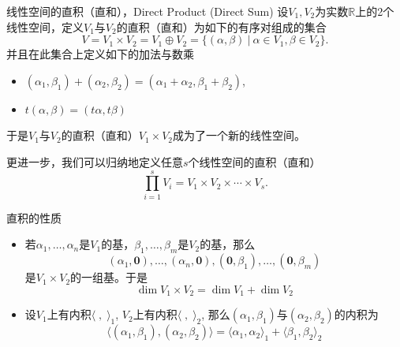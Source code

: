 \begin{frame}

\begin{block}{线性空间的直积（直和），Direct Product (Direct Sum)}
设$V_1,V_2$为实数$\mathbb{R}$上的2个线性空间，定义$V_1$与$V_2$的直积（直和）为如下的有序对组成的集合
\[V = V_1\times V_2 = V_1\oplus V_2 = \{ (\alpha, \beta) \ |\ \alpha \in V_1, \beta \in V_2\}.\]
并且在此集合上定义如下的加法与数乘
\begin{itemize}
\item $(\alpha_1, \beta_1) + (\alpha_2, \beta_2) = (\alpha_1 + \alpha_2, \beta_1 + \beta_2)$,
\item $t (\alpha, \beta) = (t\alpha, t\beta)$
\end{itemize}
于是$V_1$与$V_2$的直积（直和）$V_1\times V_2$成为了一个新的线性空间。

\pause
\vspace{2em}

更进一步，我们可以归纳地定义任意$s$个线性空间的直积（直和）
\[\prod_{i=1}^s V_i = V_1 \times V_2 \times \cdots \times V_s.\]
\end{block}

\end{frame}


\begin{frame}

\begin{block}{直积的性质}
\begin{itemize}
\item 若$\alpha_1,\ldots,\alpha_n$是$V_1$的基，$\beta_1,\ldots,\beta_m$是$V_2$的基，那么
\[(\alpha_1,\mathbf{0}),\ldots,(\alpha_n,\mathbf{0}),(\mathbf{0},\beta_1),\ldots,(\mathbf{0},\beta_m)\]
是$V_1\times V_2$的一组基。于是
\[\dim V_1\times V_2 = \dim V_1 + \dim V_2\]
\item 设$V_1$上有内积$\langle \;,\; \rangle_1$, $V_2$上有内积$\langle \;,\; \rangle_2$, 那么$(\alpha_1,\beta_1)$与$(\alpha_2,\beta_2)$的内积为
\[\langle (\alpha_1,\beta_1), (\alpha_2,\beta_2) \rangle = \langle \alpha_1, \alpha_2 \rangle_1 + \langle \beta_1, \beta_2 \rangle_2\]
\end{itemize}
\end{block}

\end{frame}


